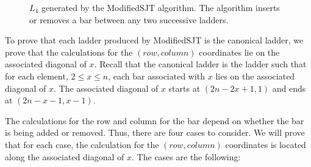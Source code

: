 {\begin{center}
\begin{figure}[!htp]
  \caption{$L_{4}$ generated by the {\sc ModifiedSJT} algorithm. The algorithm inserts or removes a bar between any two successive ladders.}
  \label{Fig:CanLSJT}
\end{figure}
\end{center}
\pagebreak



To prove that each ladder produced by {\sc ModifiedSJT} is the canonical ladder, 
we prove that the calculations for the $(row,column)$ coordinates lie on the associated diagonal of $x$. 
Recall that the canonical ladder is the ladder such that for each element, $2 \leq x \leq n$, each  
bar associated with $x$ lies on the associated diagonal of $x$. The associated diagonal of $x$ starts at 
$(2n-2x+1, 1)$ and ends at $(2n-x-1, x-1)$. \par 
The calculations for the row and column for the bar 
depend on whether the bar is being added or removed. Thus, there are
four cases to consider. We will prove that for each case, the calculation for the $(row,column)$ coordinates is located 
along the associated diagonal of $x$. The cases are the following: 
\begin{caseof}
 ~
 ~
 ~
 ~
\end{caseof}


}
